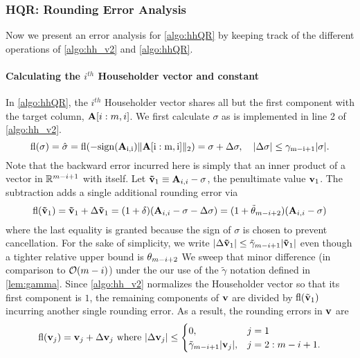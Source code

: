 \subsubsection{HQR: Rounding Error Analysis}
Now we present an error analysis for \cref{algo:hhQR} by keeping track of the different operations of \cref{algo:hh_v2} and \cref{algo:hhQR}.
\paragraph{Calculating the $i^{th}$ Householder vector and constant} 
In \cref{algo:hhQR}, the $i^{th}$ Householder vector shares all but the first component with the target column, $\mathbf{A}[i:m,i]$. 
We first calculate $\sigma$ as is implemented in line 2 of \cref{algo:hh_v2}.
\begin{equation}
\label{eqn:sigma}
\fl(\sigma) = \hat{\sigma} = \rm{fl}(-\rm{sign}(\bb{A}_{i,i})\|\bb{A}[i:m,i]\|_2) = \sigma + \Delta \sigma,\quad |\Delta\sigma| \leq \gamma_{m-i+1}|\sigma|.
\end{equation}
Note that the backward error incurred here is simply that an inner product of a vector in $\mathbb{R}^{m-i+1}$ with itself. 
Let $\mathbf{\tilde{v}}_1\equiv \mathbf{A}_{i,i}-\sigma$, the penultimate value $\mathbf{v}_1$. 
The subtraction adds a single additional rounding error via
\begin{equation*}
	\mathrm{fl}(\mathbf{\tilde{v}}_1) =\mathbf{\tilde{v}}_1 + \Delta \mathbf{\tilde{v}}_1 = (1+\delta) (\mathbf{A}_{i,i}-\sigma-\Delta\sigma)= (1+\tilde{\theta}_{m-i+2})(\mathbf{A}_{i,i}-\sigma)
\end{equation*}
where the last equality is granted because the sign of $\sigma$ is chosen to prevent cancellation.  
For the sake of simplicity, we write $|\Delta \mathbf{\tilde{v}}_1 |\leq \tilde{\gamma}_{m-i+1}|\mathbf{\tilde{v}}_1|$ even though a tighter relative upper bound is $\theta_{m-i+2}$
We sweep that minor difference (in comparison to $\mathcal{O}(m-i)$) under the our use of the $\tilde{\gamma}$ notation defined in \cref{lem:gamma}.
Since \cref{algo:hh_v2} normalizes the Householder vector so that its first component is $1$, the remaining components of $\mathbf{v}$ are divided by $\mathrm{fl}(\tilde{\mathbf{v}}_1)$ incurring another single rounding error.
As a result, the rounding errors in $\mathbf{v}$ are
\begin{equation}
	\fl(\bb{v}_j)	= \bb{v}_j + \Delta \bb{v}_j\text{ where }|\Delta \bb{v}_j|\leq 
	\begin{cases}
	0,& j=1\\
	\tilde{\gamma}_{m-i+1}|\bb{v}_j|,&j=2:m-i+1.
	\end{cases}  \label{eqn:vbound}
\end{equation}

